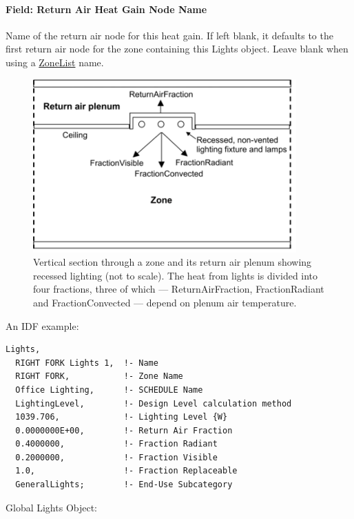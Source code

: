 \paragraph{Field: Return Air Heat Gain Node Name}\label{field-return-air-heat-gain-node-name}

Name of the return air node for this heat gain. If left blank, it defaults to the first return air node for the zone containing this Lights object. Leave blank when using a \hyperref[zonelist]{ZoneList} name.

\begin{figure}[hbtp] %
\centering
\includegraphics[width=0.9\textwidth, height=0.9\textheight, keepaspectratio=true]{media/image087.png}
\caption{Vertical section through a zone and its return air plenum showing recessed lighting (not to scale). The heat from lights is divided into four fractions, three of which --- ReturnAirFraction, FractionRadiant and FractionConvected --- depend on plenum air temperature. \protect \label{fig:vertical-section-through-a-zone-and-its}}
\end{figure}

An IDF example:

\begin{lstlisting}
Lights,
  RIGHT FORK Lights 1,  !- Name
  RIGHT FORK,           !- Zone Name
  Office Lighting,      !- SCHEDULE Name
  LightingLevel,        !- Design Level calculation method
  1039.706,             !- Lighting Level {W}
  0.0000000E+00,        !- Return Air Fraction
  0.4000000,            !- Fraction Radiant
  0.2000000,            !- Fraction Visible
  1.0,                  !- Fraction Replaceable
  GeneralLights;        !- End-Use Subcategory
\end{lstlisting}

Global Lights Object:

